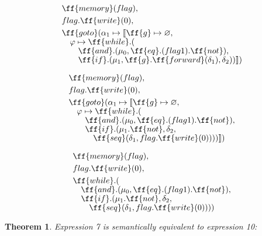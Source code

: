\documentclass[sigplan,review,11pt,nonacm,natbib=false]{acmart}
\newcommand\br{\\[-4pt]}
\newtheorem{theorem}{Theorem}[section]
\begin{document}
\begin{equation}
\begin{split}
& \ff{memory}(flag), \\
& flag.\ff{write}(0), \\
& \ff{goto} ( \alpha_1 \mapsto \llbracket \ff{g} \mapsto \varnothing, \br
& \quad \varphi \mapsto \ff{while}.(\br
& \quad \quad \ff{and}.( \mu_0, \ff{eq}.(flag  1).\ff{not}), \br
& \quad \quad \ff{if}.(\mu_1,  \ff{g}.\ff{forward}(\delta_1), \delta_2) )\rrbracket)\\[-1pt]
\end{split}
\end{equation}

\begin{equation}
\begin{split}
& \ff{memory}(flag), \\
& flag.\ff{write}(0), \\
& \ff{goto} ( \alpha_1 \mapsto \llbracket \ff{g} \mapsto \varnothing, \br
& \quad \varphi \mapsto \ff{while}.(\br
& \quad \quad \ff{and}.( \mu_0, \ff{eq}.(flag  1).\ff{not}), \br
& \quad \quad \ff{if}.(\mu_1.\ff{not}, \delta_2, \br
& \quad \quad \quad \ff{seq}( \delta_1, flag.\ff{write}(0) ) ) ) \rrbracket )\\[-1pt]
\end{split}
\end{equation}

\begin{equation}
\begin{split}
& \ff{memory}(flag), \\
& flag.\ff{write}(0), \\
& \ff{while}.(\br
& \quad \ff{and}.(\mu_0, \ff{eq}.(flag  1).\ff{not}), \br
& \quad \ff{if}.(\mu_1.\ff{not}, \delta_2, \br
& \quad \quad \ff{seq}( \delta_1, flag.\ff{write}(0) ) ) ) \\[-1pt]
\end{split}
\end{equation}

\begin{theorem}
Expression 7 is semantically equivalent to expression 10:
\end{theorem}
\end{document}
